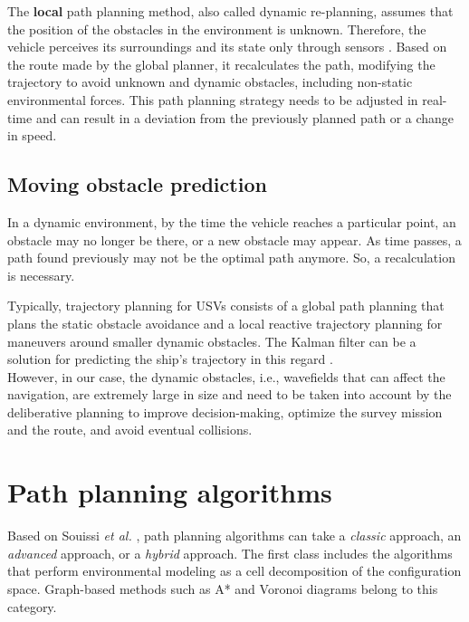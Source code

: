 The \textbf{local} path planning method, also called dynamic re-planning, assumes that the position of the obstacles in the environment is unknown. Therefore, the vehicle perceives its surroundings and its state only through sensors \cite{LIU20201}. Based on the route made by the global planner, it recalculates the path, modifying the trajectory to avoid unknown and dynamic obstacles, including non-static environmental forces.
This path planning strategy needs to be adjusted in real-time and can result in a deviation from the previously planned path or a change in speed.
\subsection{Moving obstacle prediction}
In a dynamic environment, by the time the vehicle reaches a particular point, an obstacle may no longer be there, or a new obstacle may appear. As time passes, a path found previously may not be the optimal path anymore. So, a recalculation is necessary.

Typically, trajectory planning for USVs consists of a global path planning that plans the static obstacle avoidance and a local reactive trajectory planning for maneuvers around smaller dynamic obstacles. The Kalman filter can be a solution for predicting the ship's trajectory in this regard \cite{huang2020ship}.\\
However, in our case, the dynamic obstacles, i.e., wavefields that can affect the navigation, are extremely large in size and need to be taken into account by the deliberative planning to improve decision-making, optimize the survey mission and the route, and avoid eventual collisions.
\section{Path planning algorithms} 
Based on Souissi \textit{et al.} \cite{souissi2013path}, path planning algorithms can take a \textit{classic} approach, an \textit{advanced} approach, or a \textit{hybrid} approach. The first class includes the algorithms that perform environmental modeling as a cell decomposition of the configuration space. Graph-based methods such as A* and Voronoi diagrams belong to this category.

